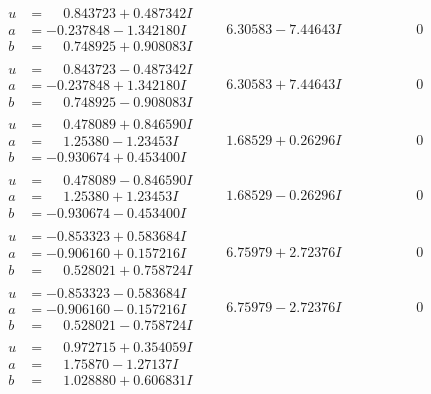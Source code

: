 \documentclass[1p]{elsarticle_modified}
\theoremstyle{definition}
\begin{document}
$$\begin{array}{c|c|c}
\begin{aligned}
u &= \phantom{-}0.843723 + 0.487342 I \\
a &= -0.237848 - 1.342180 I \\
b &= \phantom{-}0.748925 + 0.908083 I\end{aligned}
 & \phantom{-}6.30583 - 7.44643 I & \phantom{-0.000000 } 0 \\ \hline\begin{aligned}
u &= \phantom{-}0.843723 - 0.487342 I \\
a &= -0.237848 + 1.342180 I \\
b &= \phantom{-}0.748925 - 0.908083 I\end{aligned}
 & \phantom{-}6.30583 + 7.44643 I & \phantom{-0.000000 } 0 \\ \hline\begin{aligned}
u &= \phantom{-}0.478089 + 0.846590 I \\
a &= \phantom{-}1.25380 - 1.23453 I \\
b &= -0.930674 + 0.453400 I\end{aligned}
 & \phantom{-}1.68529 + 0.26296 I & \phantom{-0.000000 } 0 \\ \hline\begin{aligned}
u &= \phantom{-}0.478089 - 0.846590 I \\
a &= \phantom{-}1.25380 + 1.23453 I \\
b &= -0.930674 - 0.453400 I\end{aligned}
 & \phantom{-}1.68529 - 0.26296 I & \phantom{-0.000000 } 0 \\ \hline\begin{aligned}
u &= -0.853323 + 0.583684 I \\
a &= -0.906160 + 0.157216 I \\
b &= \phantom{-}0.528021 + 0.758724 I\end{aligned}
 & \phantom{-}6.75979 + 2.72376 I & \phantom{-0.000000 } 0 \\ \hline\begin{aligned}
u &= -0.853323 - 0.583684 I \\
a &= -0.906160 - 0.157216 I \\
b &= \phantom{-}0.528021 - 0.758724 I\end{aligned}
 & \phantom{-}6.75979 - 2.72376 I & \phantom{-0.000000 } 0 \\ \hline\begin{aligned}
u &= \phantom{-}0.972715 + 0.354059 I \\
a &= \phantom{-}1.75870 - 1.27137 I \\
b &= \phantom{-}1.028880 + 0.606831 I\end{aligned}

\end{array}$$
\end{document}

